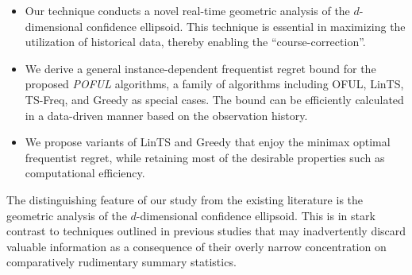     \begin{itemize}
    \item Our technique conducts a novel real-time geometric analysis of the $d$-dimensional confidence ellipsoid. This technique is essential in maximizing the utilization of historical data, thereby enabling the ``course-correction''.
\item We derive a general instance-dependent frequentist regret bound for the proposed \emph{POFUL} algorithms, a family of algorithms including OFUL, LinTS, TS-Freq, and Greedy as special cases. The bound can be efficiently calculated in a data-driven manner based on the observation history.
\item  We propose variants of LinTS and Greedy that enjoy the minimax optimal frequentist regret, while retaining most of the desirable properties such as computational efficiency.
    \end{itemize}



The distinguishing feature of our study from the existing literature is the geometric analysis of the $d$-dimensional confidence ellipsoid. 	This is in stark contrast to techniques outlined in previous studies that may inadvertently discard valuable information as a consequence of their overly narrow concentration on comparatively rudimentary summary statistics.


